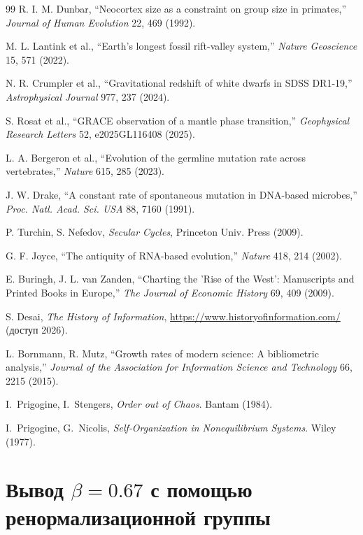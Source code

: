 \documentclass[12pt,a4paper]{article}
\theoremstyle{remark}
\begin{document}
\begin{thebibliography}{99}
		R. I. M. Dunbar, ``Neocortex size as a constraint on group size in primates,'' \emph{Journal of Human Evolution} 22, 469 (1992).
		
		M. L. Lantink et al., ``Earth's longest fossil rift-valley system,'' \emph{Nature Geoscience} 15, 571 (2022).
		
		N. R. Crumpler et al., ``Gravitational redshift of white dwarfs in SDSS DR1-19,'' \emph{Astrophysical Journal} 977, 237 (2024).
		
		S. Rosat et al., ``GRACE observation of a mantle phase transition,'' \emph{Geophysical Research Letters} 52, e2025GL116408 (2025).
		
		L. A. Bergeron et al., ``Evolution of the germline mutation rate across vertebrates,'' \emph{Nature} 615, 285 (2023).
		
		J. W. Drake, ``A constant rate of spontaneous mutation in DNA-based microbes,'' \textit{Proc. Natl. Acad. Sci. USA} 88, 7160 (1991).
		
		P. Turchin, S. Nefedov, \emph{Secular Cycles}, Princeton Univ. Press (2009).
		
		G. F. Joyce, ``The antiquity of RNA-based evolution,'' \textit{Nature} 418, 214 (2002).
		
		E. Buringh, J. L. van Zanden, ``Charting the 'Rise of the West': Manuscripts and Printed Books in Europe,'' \emph{The Journal of Economic History} 69, 409 (2009).
		
		S. Desai, \emph{The History of Information}, \url{https://www.historyofinformation.com/} (доступ 2026).
		
		L. Bornmann, R. Mutz, ``Growth rates of modern science: A bibliometric analysis,'' \emph{Journal of the Association for Information Science and Technology} 66, 2215 (2015).
		
		 I.~Prigogine, I.~Stengers, \emph{Order out of Chaos}. Bantam (1984).
		
		 I.~Prigogine, G.~Nicolis, \emph{Self‑Organization in Nonequilibrium Systems}. Wiley (1977).
		
	\end{thebibliography}
	
	\appendix
	
	\section{Вывод $\beta = 0.67$ с помощью ренормализационной группы}
	\label{app:rg}
	
\end{document}
